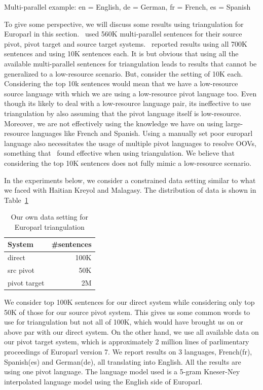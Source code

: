 \begin{table}
	\small
	\centering
	\small
	
	\caption{Multi-parallel example: en = English, de = German, fr = French, es = Spanish}
	\label{table:mparallel}
\end{table}

To give some perspective, we will discuss some results using triangulation for Europarl in this section.~\cite{Utiyama:07} used 560K multi-parallel sentences for their source pivot, pivot target and source target systems.~\cite{Cohn:07} reported results using all 700K sentences and using 10K sentences each. It is but obvious that using all the available multi-parallel sentences for triangulation leads to results that cannot be generalized to a low-resource scenario. But, consider the setting of 10K each. Considering the top 10k sentences would mean that we have a low-resource source language with which we are using a low-resource pivot language too. Even though its likely to deal with a low-resource language pair, its ineffective to use triangulation by also assuming that the pivot language itself is low-resource. Moreover, we are not effectively using the knowledge we have on using large-resource languages like French and Spanish. Using a manually set poor europarl language also necessitates the usage of multiple pivot languages to resolve OOVs, something that~\cite{Cohn:07} found effective when using triangulation. We believe that considering the top 10K sentences does not fully mimic a low-resource scenario. 

In the experiments below, we consider a constrained data setting similar to what we faced with Haitian Kreyol and Malagasy. The distribution of data is shown in Table~\ref{table:eparlsetting}

\begin{table}
	\small
	\centering
	\begin{tabular}{lr}
		\toprule
		System & \#sentences \\
		\toprule
		direct & 100K \\
		src pivot & 50K \\
		pivot target & 2M \\
		\bottomrule
	\end{tabular}
	\caption{Our own data setting for Europarl triangulation}
	\label{table:eparlsetting}
\end{table}

We consider top 100K sentences for our direct system while considering only top 50K of those for our source pivot system. This gives us some common words to use for triangulation but not all of 100K, which would have brought us on or above par with our direct system. On the other hand, we use all available data on our pivot target system, which is approximately 2 million lines of parlimentary proceedings of Europarl version 7. We report results on 3 languages, French(fr), Spanish(es) and German(de), all translating into English. All the results are using one pivot language. The language model used is a 5-gram Kneser-Ney interpolated language model using the English side of Europarl. 




